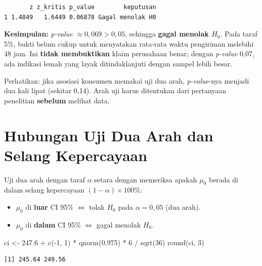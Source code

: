 \documentclass[
  indonesian,
  letterpaper,
]{book}
\newenvironment{Shaded}{\begin{snugshade}}{\end{snugshade}}
\newcommand{\DecValTok}[1]{\textcolor[rgb]{0.68,0.00,0.00}{#1}}
\newcommand{\FloatTok}[1]{\textcolor[rgb]{0.68,0.00,0.00}{#1}}
\newcommand{\FunctionTok}[1]{\textcolor[rgb]{0.28,0.35,0.67}{#1}}
\newcommand{\NormalTok}[1]{\textcolor[rgb]{0.00,0.23,0.31}{#1}}
\newcommand{\OtherTok}[1]{\textcolor[rgb]{0.00,0.23,0.31}{#1}}
\newcommand{\SpecialCharTok}[1]{\textcolor[rgb]{0.37,0.37,0.37}{#1}}
\providecommand{\tightlist}{%
  \setlength{\itemsep}{0pt}\setlength{\parskip}{0pt}}
\begin{document}
\begin{verbatim}
       z z_kritis p_value        keputusan
1 1.4849   1.6449 0.06878 Gagal menolak H0
\end{verbatim}

\textbf{Kesimpulan:} \emph{p-value} \(\approx 0{,}069 > 0{,}05\),
sehingga \textbf{gagal menolak \(H_0\)}. Pada taraf 5\%, bukti belum
cukup untuk menyatakan rata-rata waktu pengiriman melebihi 48 jam. Ini
\textbf{tidak membuktikan} klaim perusahaan benar; dengan \emph{p-value}
0,07, ada indikasi lemah yang layak ditindaklanjuti dengan sampel lebih
besar.

Perhatikan: jika asosiasi konsumen memakai uji dua arah,
\emph{p-value}-nya menjadi dua kali lipat (sekitar 0,14). Arah uji harus
ditentukan dari pertanyaan penelitian \textbf{sebelum} melihat data.


\chapter{Hubungan Uji Dua Arah dan Selang
Kepercayaan}\label{hubungan-uji-dua-arah-dan-selang-kepercayaan}

Uji dua arah dengan taraf \(\alpha\) setara dengan memeriksa apakah
\(\mu_0\) berada di dalam selang kepercayaan
\((1-\alpha) \times 100\%\):

\begin{itemize}
\tightlist
\item
  \(\mu_0\) di \textbf{luar} CI 95\% \(\iff\) tolak \(H_0\) pada
  \(\alpha = 0{,}05\) (dua arah).
\item
  \(\mu_0\) di \textbf{dalam} CI 95\% \(\iff\) gagal menolak \(H_0\).
\end{itemize}

\begin{Shaded}
\begin{Highlighting}[]
\NormalTok{ci }\OtherTok{\textless{}{-}} \FloatTok{247.6} \SpecialCharTok{+} \FunctionTok{c}\NormalTok{(}\SpecialCharTok{{-}}\DecValTok{1}\NormalTok{, }\DecValTok{1}\NormalTok{) }\SpecialCharTok{*} \FunctionTok{qnorm}\NormalTok{(}\FloatTok{0.975}\NormalTok{) }\SpecialCharTok{*} \DecValTok{6} \SpecialCharTok{/} \FunctionTok{sqrt}\NormalTok{(}\DecValTok{36}\NormalTok{)}
\FunctionTok{round}\NormalTok{(ci, }\DecValTok{3}\NormalTok{)}
\end{Highlighting}
\end{Shaded}

\begin{verbatim}
[1] 245.64 249.56
\end{verbatim}
\end{document}
